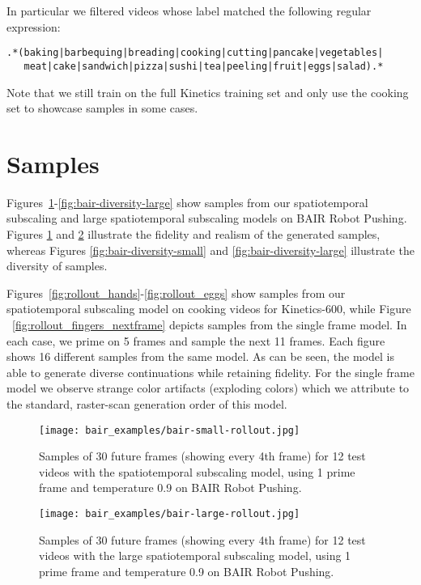\documentclass{article} \usepackage{iclr2020_conference,times}
\begin{document}
In particular we filtered videos whose label matched the following regular expression:

\begin{verbatim}
.*(baking|barbequing|breading|cooking|cutting|pancake|vegetables|
   meat|cake|sandwich|pizza|sushi|tea|peeling|fruit|eggs|salad).*
\end{verbatim}

Note that we still train on the full Kinetics training set and only use the cooking set to showcase samples in some cases.


\section{Samples}\label{sec:rollouts}

Figures~\ref{fig:bair-rollout-small}-\ref{fig:bair-diversity-large} show samples from our spatiotemporal subscaling and large spatiotemporal subscaling models on BAIR Robot Pushing. Figures \ref{fig:bair-rollout-small} and \ref{fig:bair-rollout-large} illustrate the fidelity and realism of the generated samples, whereas Figures \ref{fig:bair-diversity-small} and \ref{fig:bair-diversity-large} illustrate the diversity of samples.

Figures~\ref{fig:rollout_hands}-\ref{fig:rollout_eggs} show samples from our spatiotemporal subscaling model on cooking videos for Kinetics-600, while Figure ~\ref{fig:rollout_fingers_nextframe} depicts samples from the single frame model. In each case, we prime on 5 frames and sample the next 11 frames. Each figure shows 16 different samples from the same model. As can be seen, the model is able to generate diverse continuations while retaining fidelity. For the single frame model we observe strange color artifacts (exploding colors) which we attribute to the standard, raster-scan generation order of this model.



\begin{figure}[p]
    \centering
    \texttt{[image: bair\_examples/bair-small-rollout.jpg]}
    \caption{Samples of 30 future frames (showing every 4th frame) for 12 test videos with the spatiotemporal subscaling model, using 1 prime frame and temperature 0.9 on BAIR Robot Pushing.}
    \label{fig:bair-rollout-small}
\end{figure}

\begin{figure}[p]
    \centering
    \texttt{[image: bair\_examples/bair-large-rollout.jpg]}
    \caption{Samples of 30 future frames (showing every 4th frame) for 12 test videos with the large spatiotemporal subscaling model, using 1 prime frame and temperature 0.9 on BAIR Robot Pushing.}
    \label{fig:bair-rollout-large}
\end{figure}
\end{document}
